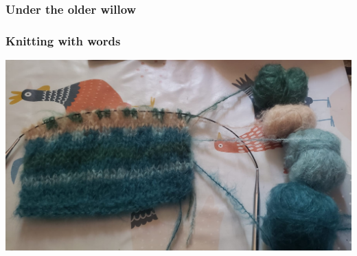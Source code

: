 \documentclass[math, english, info]{beamercours}
\begin{document}
\begin{frame}
	\frametitle{Under the older willow}
\end{frame}

\begin{frame}
	\frametitle{Knitting with words}
	\centering
	\includegraphics[width=.7\textwidth]{aux/figures/knitting-example.jpeg}
\end{frame}
\end{document}
